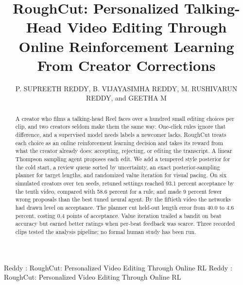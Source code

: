 \documentclass{ieeeaccess}
\begin{document}

\title{RoughCut: Personalized Talking-Head Video Editing Through Online Reinforcement Learning From Creator Corrections}
\author{\uppercase{P. Supreeth Reddy},
\uppercase{B. Vijayasimha Reddy},
\uppercase{M. Rushivarun Reddy}, and
\uppercase{Geetha M}}
\address[1]{Department of Computer Science and Engineering, Amrita School of Computing, Amrita Vishwa Vidyapeetham, Amritapuri, Kerala, India (e-mail: am.sc.u4ae23142@am.students.amrita.edu, am.sc.u4aie23110@am.students.amrita.edu,\newline am.sc.u4aie23128@am.students.amrita.edu, geetham@am.amrita.edu)}

\markboth
{Reddy \headeretal: RoughCut: Personalized Video Editing Through Online RL}
{Reddy \headeretal: RoughCut: Personalized Video Editing Through Online RL}


\begin{abstract}
A creator who films a talking-head Reel faces over a hundred small editing choices per clip, and two creators seldom make them the same way. One-click rules ignore that difference, and a supervised model needs labels a newcomer lacks. RoughCut treats each choice as an online reinforcement learning decision and takes its reward from what the creator already does: accepting, rejecting, or editing the transcript. A linear Thompson sampling agent proposes each edit. We add a tempered style posterior for the cold start, a review queue sorted by uncertainty, an exact posterior-sampling planner for target lengths, and randomized value iteration for visual pacing. On six simulated creators over ten seeds, retuned settings reached 93.1 percent acceptance by the tenth video, compared with 58.6 percent for a rule, and made 9 percent fewer wrong proposals than the best tuned neural agent. By the fiftieth video the networks had drawn level on acceptance. The planner cut held-out length error from 40.0 to 4.6 percent, costing 0.4 points of acceptance. Value iteration trailed a bandit on beat accuracy but earned better ratings when per-beat feedback was scarce. Three recorded clips tested the analysis pipeline; no formal human study has been run.

\end{abstract}
\end{document}
